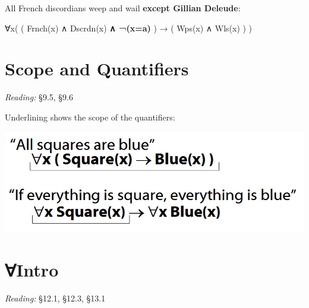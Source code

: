 \documentclass[12pt]{extarticle}
\begin{document}
\begin{multicols*}{3}
\begin{minipage}{\columnwidth}
\end{minipage}
 
\begin{minipage}{\columnwidth}
 
All French discordians weep and wail \textbf{except Gillian Deleude}:
 
∀x( ( Frnch(x) ∧ Dscrdn(x) \textbf{∧ ¬(x=a)} ) → ( Wps(x) ∧ Wls(x) ) )
 
\end{minipage}
 
 
 
\section{Scope and Quantifiers}
 
\emph{Reading:} §9.5, §9.6
 
\begin{minipage}{\columnwidth}
 
Underlining shows the scope of the quantifiers:
 
\begin{center}
\includegraphics[scale=0.23]{img/scope_quantifiers.png}
\end{center}
\end{minipage}
 
 
 
\section{∀Intro}
 
\emph{Reading:} §12.1, §12.3, §13.1
 

\end{multicols*}
\end{document}
